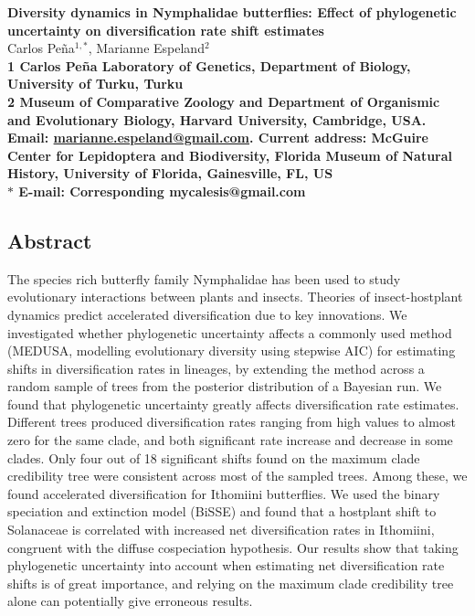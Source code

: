 \documentclass[10pt]{article}
\author{}
\date{}
\begin{document}
\begin{flushleft}
{\Large
\textbf{Diversity dynamics in Nymphalidae butterflies: Effect of
phylogenetic uncertainty on diversification rate shift estimates}
}
\\
Carlos Pe\~na$^{1,\ast}$, 
Marianne Espeland$^{2}$
\\
\bf{1} Carlos Pe\~na Laboratory of Genetics, Department of Biology, University of Turku, Turku
\\
\bf{2} Museum of Comparative Zoology and Department of Organismic and
Evolutionary Biology, Harvard University, Cambridge, USA. Email:
\href{mailto:marianne.espeland@gmail.com}{marianne.espeland@gmail.com}.
Current address: McGuire Center for Lepidoptera and Biodiversity,
Florida Museum of Natural History, University of Florida, Gainesville,
FL, US
\\
$\ast$ E-mail: Corresponding mycalesis@gmail.com
\end{flushleft}




\subsection{Abstract}\label{abstract}

The species rich butterfly family Nymphalidae has been used to study
evolutionary interactions between plants and insects. Theories of
insect-hostplant dynamics predict accelerated diversification due to key
innovations. We investigated whether phylogenetic uncertainty affects a
commonly used method (MEDUSA, modelling evolutionary diversity using
stepwise AIC) for estimating shifts in diversification rates in
lineages, by extending the method across a random sample of trees from
the posterior distribution of a Bayesian run. We found that phylogenetic
uncertainty greatly affects diversification rate estimates. Different
trees produced diversification rates ranging from high values to almost
zero for the same clade, and both significant rate increase and decrease
in some clades. Only four out of 18 significant shifts found on the
maximum clade credibility tree were consistent across most of the
sampled trees. Among these, we found accelerated diversification for
Ithomiini butterflies. We used the binary speciation and extinction
model (BiSSE) and found that a hostplant shift to Solanaceae is
correlated with increased net diversification rates in Ithomiini,
congruent with the diffuse cospeciation hypothesis. Our results show
that taking phylogenetic uncertainty into account when estimating net
diversification rate shifts is of great importance, and relying on the
maximum clade credibility tree alone can potentially give erroneous
results.
\end{document}
